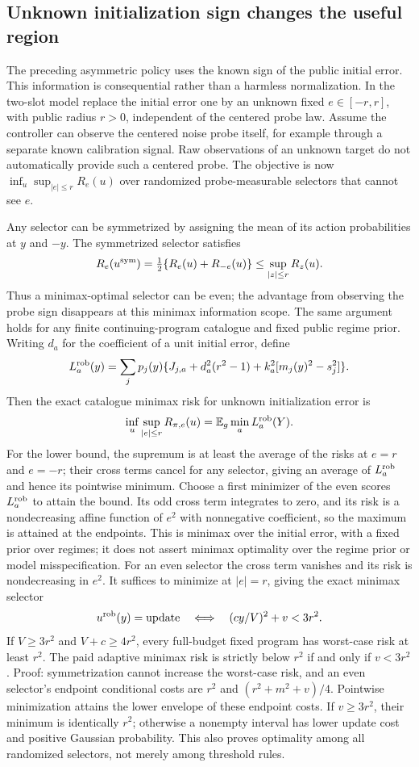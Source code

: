 \subsection{Unknown initialization sign changes the useful region}
The preceding asymmetric policy uses the known sign of the public initial error.
This information is consequential rather than a harmless normalization.
In the two-slot model replace the initial error one by an unknown fixed $e\in[-r,r]$, with public radius $r>0$, independent of the centered probe law.
Assume the controller can observe the centered noise probe itself, for example through a separate known calibration signal.
Raw observations of an unknown target do not automatically provide such a centered probe.
The objective is now $\inf_u\sup_{|e|\le r}R_e(u)$ over randomized probe-measurable selectors that cannot see $e$.

Any selector can be symmetrized by assigning the mean of its action probabilities at $y$ and $-y$.
The symmetrized selector satisfies
\[
R_e(u^{\rm sym})=\tfrac12\{R_e(u)+R_{-e}(u)\}
\le\sup_{|z|\le r}R_z(u).
\]
Thus a minimax-optimal selector can be even; the advantage from observing the probe sign disappears at this minimax information scope.
The same argument holds for any finite continuing-program catalogue and fixed public regime prior.
Writing $d_a$ for the coefficient of a unit initial error, define
\[
L_a^{\rm rob}(y)=\sum_jp_j(y)\{J_{j,a}+d_a^2(r^2-1)
+k_a^2[m_j(y)^2-s_j^2]\}.
\]
Then the exact catalogue minimax risk for unknown initialization error is
\begin{equation}
\inf_u\sup_{|e|\le r}R_{\pi,e}(u)
=\mathbb E_g\min_aL_a^{\rm rob}(Y).
\label{eq:research-robust-envelope}
\end{equation}
For the lower bound, the supremum is at least the average of the risks at $e=r$ and $e=-r$; their cross terms cancel for any selector, giving an average of $L_a^{\rm rob}$ and hence its pointwise minimum.
Choose a first minimizer of the even scores $L_a^{\rm rob}$ to attain the bound.
Its odd cross term integrates to zero, and its risk is a nondecreasing affine function of $e^2$ with nonnegative coefficient, so the maximum is attained at the endpoints.
This is minimax over the initial error, with a fixed prior over regimes; it does not assert minimax optimality over the regime prior or model misspecification.
For an even selector the cross term vanishes and its risk is nondecreasing in $e^2$.
It suffices to minimize at $|e|=r$, giving the exact minimax selector
\[
u^{\rm rob}(y)=\text{update}\quad\Longleftrightarrow\quad
(c y/V)^2+v<3r^2.
\]
If $V\ge3r^2$ and $V+c\ge4r^2$, every full-budget fixed program has worst-case risk at least $r^2$.
The paid adaptive minimax risk is strictly below $r^2$ if and only if $v<3r^2$.
Proof: symmetrization cannot increase the worst-case risk, and an even selector's endpoint conditional costs are $r^2$ and $(r^2+m^2+v)/4$.
Pointwise minimization attains the lower envelope of these endpoint costs.
If $v\ge3r^2$, their minimum is identically $r^2$; otherwise a nonempty interval has lower update cost and positive Gaussian probability.
This also proves optimality among all randomized selectors, not merely among threshold rules.

